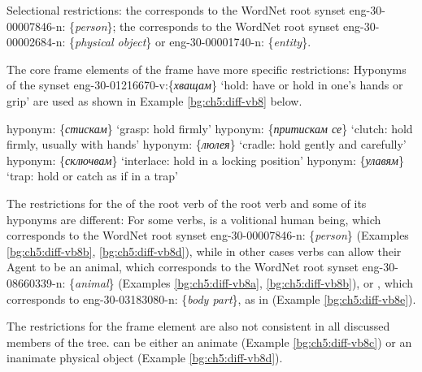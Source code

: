 \documentclass[output=paper,colorlinks,citecolor=brown]{langscibook}
\begin{document}
Selectional restrictions: the  corresponds to the WordNet root synset eng-30-00007846-n: \{\textit{person}\}; the  corresponds to the WordNet root syn\-set eng-30-00002684-n: \{\textit{physical object}\} or eng-30-00001740-n: \{\textit{entity}\}. 

The core frame elements of the frame  have more specific restrictions: Hyponyms of the synset eng-30-01216670-v:\{\textit{хващам}\} ‘hold: have or hold in one's hands or grip’ are used as shown in Example \ref{bg:ch5:diff-vb8} below.
\begin{exe} 
\ex \label{bg:ch5:diff-vb8} 
\begin{xlist}
\ex \label{bg:ch5:diff-vb8a} %
hyponym: \{\textit{стискам}\} ‘grasp: hold firmly’
\ex \label{bg:ch5:diff-vb8b} 
hyponym: \{\textit{притискам се}\} ‘clutch: hold firmly, usually with hands’
\ex \label{bg:ch5:diff-vb8c} 
hyponym: \{\textit{люлея}\} ‘cradle: hold gently and carefully’
\ex\label{bg:ch5:diff-vb8d} 
hyponym: \{\textit{сключвам}\} ‘interlace: hold in a locking position’
\ex \label{bg:ch5:diff-vb8e} 
hyponym: \{\textit{улавям}\} ‘trap: hold or catch as if in a trap’
\end{xlist}
\end{exe}

The restrictions for the  of the root verb of the root verb and some of its hyponyms are different: For some verbs,  is a volitional human being, which corresponds to the WordNet root synset eng-30-00007846-n: \{\textit{person}\} (Examples \ref{bg:ch5:diff-vb8b}, \ref{bg:ch5:diff-vb8d}), while in other cases  verbs can allow their Agent to be an animal, which corresponds to the WordNet root synset eng-30-08660339-n: \{\textit{animal}\} (Examples \ref{bg:ch5:diff-vb8a}, \ref{bg:ch5:diff-vb8b}), or ,  which corresponds to eng-30-03183080-n: \{\textit{body part}\}, as in (Example \ref{bg:ch5:diff-vb8e}).

The restrictions for the frame element  are also not consistent in all discussed members of the tree.  can be either an animate (Example \ref{bg:ch5:diff-vb8c}) or an inanimate physical object (Example \ref{bg:ch5:diff-vb8d}). 
\end{document}
